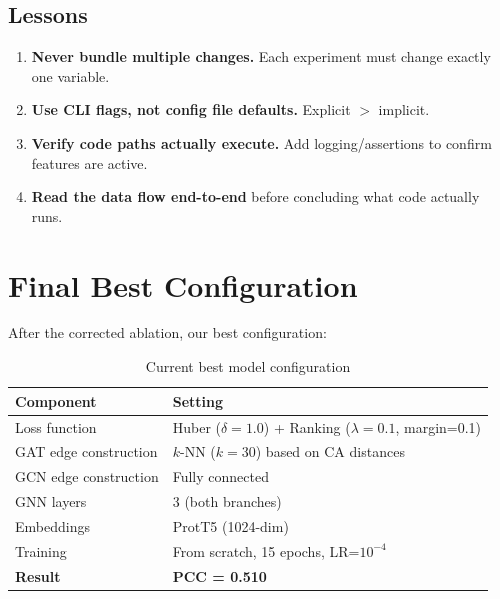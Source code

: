 \subsection{Lessons}

\begin{enumerate}
    \item \textbf{Never bundle multiple changes.} Each experiment must change exactly one variable.
    \item \textbf{Use CLI flags, not config file defaults.} Explicit $>$ implicit.
    \item \textbf{Verify code paths actually execute.} Add logging/assertions to confirm features are active.
    \item \textbf{Read the data flow end-to-end} before concluding what code actually runs.
\end{enumerate}

\section{Final Best Configuration}

After the corrected ablation, our best configuration:

\begin{table}[h]
\centering
\caption{Current best model configuration}
\label{tab:best_config}
\begin{tabular}{ll}
\toprule
\textbf{Component} & \textbf{Setting} \\
\midrule
Loss function & Huber ($\delta=1.0$) + Ranking ($\lambda=0.1$, margin=0.1) \\
GAT edge construction & $k$-NN ($k=30$) based on CA distances \\
GCN edge construction & Fully connected \\
GNN layers & 3 (both branches) \\
Embeddings & ProtT5 (1024-dim) \\
Training & From scratch, 15 epochs, LR=$10^{-4}$ \\
\textbf{Result} & \textbf{PCC = 0.510} \\
\bottomrule
\end{tabular}
\end{table}
